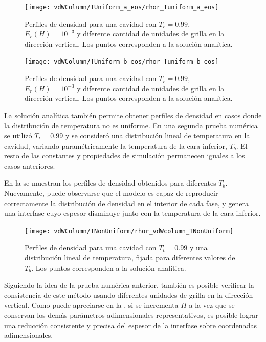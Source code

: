 \begin{figure}[ht]
	\centering
	\texttt{[image: vdWColumn/TUniform\_a\_eos/rhor\_Tuniform\_a\_eos]}
	\caption{Perfiles de densidad para una cavidad con $T_r = 0.99$, $E_r(H) = 10^{-3}$ y diferente cantidad de unidades de grilla en la direcci\'on vertical. Los puntos corresponden a la soluci\'on anal\'itica.}
	\label{fig:vdWColumn_b_eos}
\end{figure}

\begin{figure}[ht]
	\centering
	\texttt{[image: vdWColumn/TUniform\_b\_eos/rhor\_Tuniform\_b\_eos]}
	\caption{Perfiles de densidad para una cavidad con $T_r = 0.99$, $E_r(H) = 10^{-3}$ y diferente cantidad de unidades de grilla en la direcci\'on vertical. Los puntos corresponden a la soluci\'on anal\'itica.}
	\label{fig:vdWColumn_a_eos}
\end{figure}
\FloatBarrier

La soluci\'on anal\'itica tambi\'en permite obtener perfiles de densidad en casos donde la distribuci\'on de temperatura no es uniforme. En una segunda prueba num\'erica se utiliz\'o $T_t=0.99$ y se consider\'o una distribuci\'on lineal de temperatura en la cavidad, variando param\'etricamente la temperatura de la cara inferior, $T_b$. El resto de las constantes y propiedades de simulaci\'on permanecen iguales a los casos anteriores.

En la  se muestran los perfiles de densidad obtenidos para diferentes $T_b$. Nuevamente, puede observarse que el modelo \pp{} es capaz de reproducir correctamente la distribuci\'on de densidad en el interior de cada fase, y genera una interfase cuyo espesor disminuye junto con la temperatura de la cara inferior.

\begin{figure}[ht]
	\centering
	\texttt{[image: vdWColumn/TNonUniform/rhor\_vdWcolumn\_TNonUniform]}
	\caption{Perfiles de densidad para una cavidad con $T_t = 0.99$ y una distribuci\'on lineal de temperatura, fijada para diferentes valores de $T_b$. Los puntos corresponden a la soluci\'on anal\'itica.}
	\label{fig:vdWColumn_rhor_TNonUniform}
\end{figure}

Siguiendo la idea de la prueba num\'erica anterior, tambi\'en es posible verificar la consistencia de este m\'etodo \pp{} usando diferentes unidades de grilla en la direcci\'on vertical. Como puede apreciarse en la , si se incrementa $H$ a la vez que se conservan los dem\'as par\'ametros adimensionales representativos, es posible lograr una reducci\'on consistente y precisa del espesor de la interfase sobre coordenadas adimensionales.

